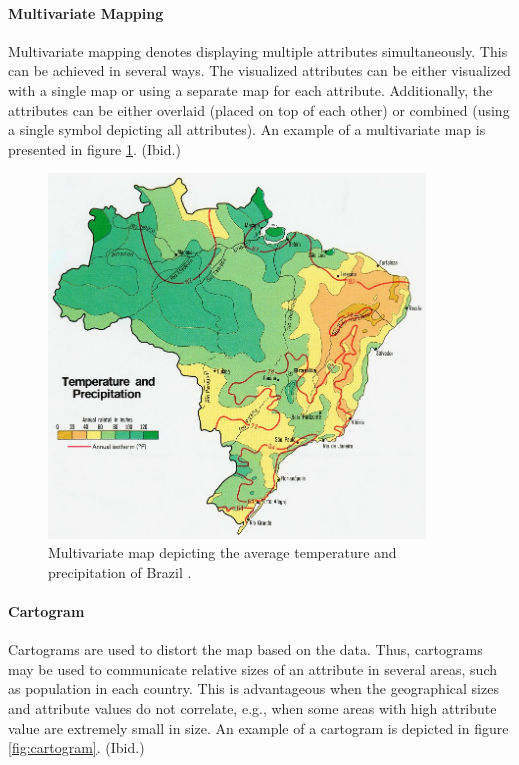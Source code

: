 \paragraph{Multivariate Mapping}

Multivariate mapping denotes displaying multiple attributes simultaneously. This can be achieved in several ways. The visualized attributes can be either visualized with a single map or using a separate map for each attribute. Additionally, the attributes can be either overlaid (placed on top of each other) or combined (using a single symbol depicting all attributes). An example of a multivariate map is presented in figure \ref{fig:multivariate}. (Ibid.)

\begin{figure}[htbp]
  \begin{center}
    \includegraphics[width=10cm]{images/multivariate-example.jpg}
    \caption{Multivariate map depicting the average temperature and precipitation of Brazil \citep{central_intelligence_agency_temperature_1977}.}
    \label{fig:multivariate}
  \end{center}
\end{figure}

\paragraph{Cartogram}

Cartograms are used to distort the map based on the data. Thus, cartograms may be used to communicate relative sizes of an attribute in several areas, such as population in each country. This is advantageous when the geographical sizes and attribute values do not correlate, e.g., when some areas with high attribute value are extremely small in size. An example of a cartogram is depicted in figure \ref{fig:cartogram}. (Ibid.)

